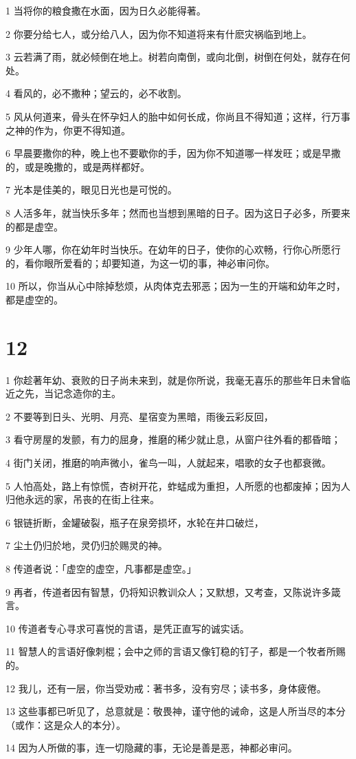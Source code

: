 \par 1 当将你的粮食撒在水面，因为日久必能得著。
\par 2 你要分给七人，或分给八人，因为你不知道将来有什麽灾祸临到地上。
\par 3 云若满了雨，就必倾倒在地上。树若向南倒，或向北倒，树倒在何处，就存在何处。
\par 4 看风的，必不撒种；望云的，必不收割。
\par 5 风从何道来，骨头在怀孕妇人的胎中如何长成，你尚且不得知道；这样，行万事之神的作为，你更不得知道。
\par 6 早晨要撒你的种，晚上也不要歇你的手，因为你不知道哪一样发旺；或是早撒的，或是晚撒的，或是两样都好。
\par 7 光本是佳美的，眼见日光也是可悦的。
\par 8 人活多年，就当快乐多年；然而也当想到黑暗的日子。因为这日子必多，所要来的都是虚空。
\par 9 少年人哪，你在幼年时当快乐。在幼年的日子，使你的心欢畅，行你心所愿行的，看你眼所爱看的；却要知道，为这一切的事，神必审问你。
\par 10 所以，你当从心中除掉愁烦，从肉体克去邪恶；因为一生的开端和幼年之时，都是虚空的。

\chapter{12}

\par 1 你趁著年幼、衰败的日子尚未来到，就是你所说，我毫无喜乐的那些年日未曾临近之先，当记念造你的主。
\par 2 不要等到日头、光明、月亮、星宿变为黑暗，雨後云彩反回，
\par 3 看守房屋的发颤，有力的屈身，推磨的稀少就止息，从窗户往外看的都昏暗；
\par 4 街门关闭，推磨的响声微小，雀鸟一叫，人就起来，唱歌的女子也都衰微。
\par 5 人怕高处，路上有惊慌，杏树开花，蚱蜢成为重担，人所愿的也都废掉；因为人归他永远的家，吊丧的在街上往来。
\par 6 银链折断，金罐破裂，瓶子在泉旁损坏，水轮在井口破烂，
\par 7 尘土仍归於地，灵仍归於赐灵的神。
\par 8 传道者说：「虚空的虚空，凡事都是虚空。」
\par 9 再者，传道者因有智慧，仍将知识教训众人；又默想，又考查，又陈说许多箴言。
\par 10 传道者专心寻求可喜悦的言语，是凭正直写的诚实话。
\par 11 智慧人的言语好像刺棍；会中之师的言语又像钉稳的钉子，都是一个牧者所赐的。
\par 12 我儿，还有一层，你当受劝戒：著书多，没有穷尽；读书多，身体疲倦。
\par 13 这些事都已听见了，总意就是：敬畏神，谨守他的诫命，这是人所当尽的本分（或作：这是众人的本分）。
\par 14 因为人所做的事，连一切隐藏的事，无论是善是恶，神都必审问。


